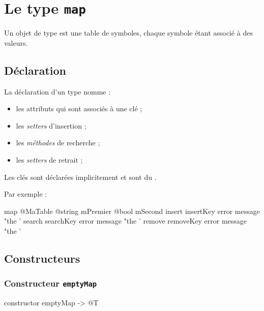 
\chapter{Le type \texttt{map}}

Un objet de type  est une table de symboles, chaque symbole étant associé à des valeurs.

\section{Déclaration}

La déclaration d'un type  nomme :
\begin{itemize}
  \item les attributs qui sont associés à une clé ;
  \item les \emph{setters} d'insertion ;
  \item les \emph{méthodes} de recherche ;
  \item les \emph{setters} de retrait ;
\end{itemize}

Les clés sont déclarées implicitement et sont du .

Par exemple :

\begin{galgascode}
map @MaTable {
  @string mPremier
  @bool mSecond
  insert insertKey error message "the '%
  search searchKey error message "the '%
  remove removeKey error message "the '%
}
\end{galgascode}







\section{Constructeurs}

\subsection{Constructeur \texttt{emptyMap}}

\begin{galgascode}
constructor emptyMap -> @T
\end{galgascode}

